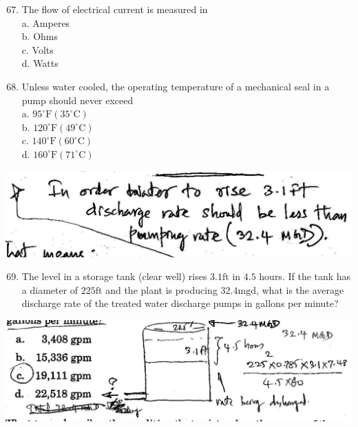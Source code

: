 \documentclass[10pt]{article}
\begin{document}
\begin{enumerate}
  \setcounter{enumi}{66}
  \item The flow of electrical current is measured in\\
a. Amperes\\
b. Ohms\\
c. Volts\\
d. Watts

  \item Unless water cooled, the operating temperature of a mechanical seal in a pump should never exceed\\
a. $95^{\circ} \mathrm{F}\left(35^{\circ} \mathrm{C}\right)$\\
b. $120^{\circ} \mathrm{F}\left(49^{\circ} \mathrm{C}\right)$\\
c. $140^{\circ} \mathrm{F}\left(60^{\circ} \mathrm{C}\right)$\\
d. $160^{\circ} \mathrm{F}\left(71^{\circ} \mathrm{C}\right)$

\end{enumerate}

\includegraphics[max width=\textwidth]{2022_11_11_ca6a6c1a0324ee23e523g-63}

\begin{enumerate}
  \setcounter{enumi}{68}
  \item The level in a storage tank (clear well) rises $3.1 \mathrm{ft}$ in $4.5$ hours. If the tank has a diameter of $225 \mathrm{ft}$ and the plant is producing $32.4 \mathrm{mgd}$, what is the average discharge rate of the treated water discharge pumps in gallons per minute?
\end{enumerate}

\includegraphics[max width=\textwidth]{2022_11_11_ca6a6c1a0324ee23e523g-63(1)}
\end{document}
